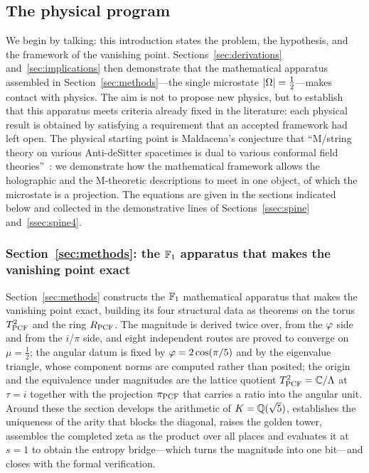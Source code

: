 \subsection{The physical program}\label{sec:physics}
We begin by talking: this introduction states the problem, the hypothesis, and the framework of
the vanishing point. Sections~\ref{sec:derivations} and~\ref{sec:implications} then demonstrate
that the mathematical apparatus assembled in Section~\ref{sec:methods}---the single microstate
$|\Omega|=\tfrac12$---makes contact with physics. The aim is not to propose new physics, but to
establish that this apparatus meets criteria already fixed in the literature: each physical
result is obtained by satisfying a requirement that an accepted framework had left open. The
physical starting point is Maldacena's conjecture that ``M/string theory on various
Anti-deSitter spacetimes is dual to various conformal field
theories''~\cite{Maldacena98}\label{sssec:frameworks}: we demonstrate how the mathematical
framework allows the holographic and the M-theoretic descriptions to meet in one object, of
which the microstate is a projection. The equations are given in the sections indicated below
and collected in the demonstrative lines of Sections~\ref{ssec:spine} and~\ref{ssec:spine4}.

\subsubsection{Section~\ref{sec:methods}: the $\mathbb{F}_1$ apparatus that makes the vanishing point
exact}
Section~\ref{sec:methods} constructs the $\mathbb{F}_1$ mathematical apparatus that makes the
vanishing point exact, building its four structural data as theorems on the torus
$T^2_{\mathrm{PCF}}$ and the ring $R_{\mathrm{PCF}}$. The magnitude is derived twice over, from the $\varphi$
side and from the $i$/$\pi$ side, and eight independent routes are proved to converge on
$\mu=\tfrac12$; the angular datum is fixed by $\varphi=2\cos(\pi/5)$ and by the eigenvalue
triangle, whose component norms are computed rather than posited; the origin and the
equivalence under magnitudes are the lattice quotient $T^2_{\mathrm{PCF}}=\mathbb{C}/\Lambda$ at $\tau=i$
together with the projection $\pi_{\mathrm{PCF}}$ that carries a ratio into the angular unit. Around
these the section develops the arithmetic of $K=\mathbb{Q}(\sqrt5)$, establishes the uniqueness of the
arity that blocks the diagonal, raises the golden tower, assembles the completed zeta as the
product over all places and evaluates it at $s=1$ to obtain the entropy bridge---which turns
the magnitude into one bit---and closes with the formal verification.

